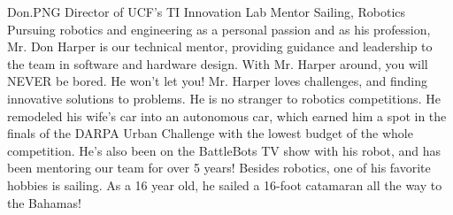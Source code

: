 {Don.PNG}
{Director of UCF's TI \newline Innovation Lab}
{Mentor} 
{Sailing, Robotics}
{
Pursuing robotics and engineering as a personal passion and as his profession, Mr. Don Harper is our technical mentor, providing guidance and leadership to the team in software and hardware design. With Mr. Harper around, you will NEVER be bored. He won't let you! Mr. Harper loves challenges, and finding innovative solutions to problems. He is no stranger to robotics competitions. He remodeled his wife's car into an autonomous car, which earned him a spot in the finals of the DARPA Urban Challenge with the lowest budget of the whole competition. He's also been on the BattleBots TV show with his robot, and has been mentoring our team for over 5 years! Besides robotics, one of his favorite hobbies is sailing. As a 16 year old, he sailed a 16-foot catamaran all the way to the Bahamas!
}
